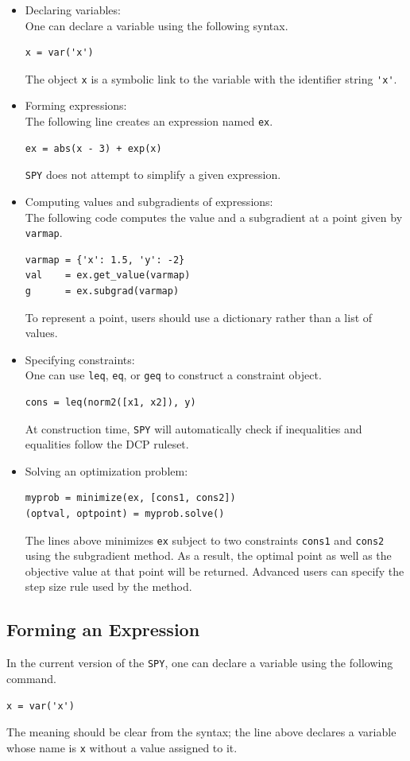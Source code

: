 \documentclass[12pt]{article}
\begin{document}
\begin{itemize}
\item Declaring variables: \\
One can declare a variable using the following syntax.
\begin{verbatim}
x = var('x')
\end{verbatim}
The object \verb'x' is a symbolic link to the variable with the identifier string \verb,'x',.
\item Forming expressions: \\
The following line creates an expression named \verb'ex'.
\begin{verbatim}
ex = abs(x - 3) + exp(x)
\end{verbatim}
\verb'SPY' does not attempt to simplify a given expression.
\item Computing values and subgradients of expressions: \\
The following code computes the value and a subgradient at a point given by \verb'varmap'.
\begin{verbatim}
varmap = {'x': 1.5, 'y': -2}
val    = ex.get_value(varmap)
g      = ex.subgrad(varmap)
\end{verbatim}
To represent a point, users should use a dictionary rather than a list of values.
\item Specifying constraints: \\
One can use \verb'leq', \verb'eq', or \verb'geq' to construct a constraint object.
\begin{verbatim}
cons = leq(norm2([x1, x2]), y)
\end{verbatim}
At construction time, \verb'SPY' will automatically check if inequalities and equalities follow the DCP ruleset.
\item Solving an optimization problem:
\begin{verbatim}
myprob = minimize(ex, [cons1, cons2])
(optval, optpoint) = myprob.solve()
\end{verbatim}
The lines above minimizes \verb'ex' subject to two constraints \verb'cons1' and \verb'cons2' using the subgradient method. As a result, the optimal point as well as the objective value at that point will be returned. Advanced users can specify the step size rule used by the method.
\end{itemize}

\subsection{Forming an Expression}
In the current version of the \verb'SPY', one can declare a variable using the following command.
\begin{verbatim}
x = var('x')
\end{verbatim}
The meaning should be clear from the syntax; the line above declares a variable whose name is \verb'x' without a value assigned to it.
\end{document}

